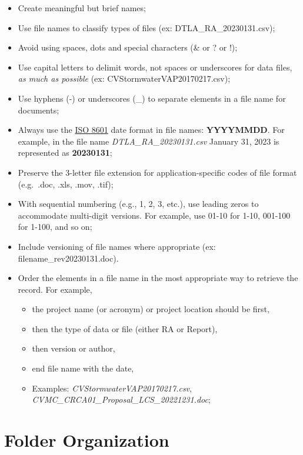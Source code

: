 \documentclass[
]{book}
\providecommand{\tightlist}{%
  \setlength{\itemsep}{0pt}\setlength{\parskip}{0pt}}
\begin{document}
\begin{itemize}
\item
  Create meaningful but brief names;
\item
  Use file names to classify types of files (ex: DTLA\_RA\_20230131.csv);
\item
  Avoid using spaces, dots and special characters (\& or ? or !);
\item
  Use capital letters to delimit words, not spaces or underscores for data files, \emph{as much as possible} (ex: CVStormwaterVAP20170217.csv);
\item
  Use hyphens (-) or underscores (\_) to separate elements in a file name for documents;
\item
  Always use the \href{https://www.iso.org/iso-8601-date-and-time-format.html}{ISO 8601} date format in file names: \textbf{YYYYMMDD}. For example, in the file name \emph{DTLA\_RA\_20230131.csv} January 31, 2023 is represented as \textbf{20230131};
\item
  Preserve the 3-letter file extension for application-specific codes of file format (e.g.~.doc, .xls, .mov, .tif);
\item
  With sequential numbering (e.g., 1, 2, 3, etc.), use leading zeros to accommodate multi-digit versions. For example, use 01-10 for 1-10, 001-100 for 1-100, and so on;
\item
  Include versioning of file names where appropriate (ex: filename\_rev20230131.doc).
\item
  Order the elements in a file name in the most appropriate way to retrieve the record. For example,

  \begin{itemize}
  \tightlist
  \item
    the project name (or acronym) or project location should be first,
  \item
    then the type of data or file (either RA or Report),
  \item
    then version or author,
  \item
    end file name with the date,
  \item
    Examples: \emph{CVStormwaterVAP20170217.csv}, \emph{CVMC\_CRCA01\_Proposal\_LCS\_20221231.doc};
  \end{itemize}
\end{itemize}

\hypertarget{folder-organization}{%
\section{Folder Organization}\label{folder-organization}}
\end{document}
